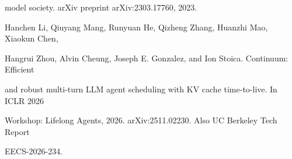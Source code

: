 \begin{flushleft}
\noindent  model society. arXiv preprint arXiv:2303.17760, 2023.\par
\noindent [16] Hanchen Li, Qiuyang Mang, Runyuan He, Qizheng Zhang, Huanzhi Mao, Xiaokun Chen,\par
\noindent  Hangrui Zhou, Alvin Cheung, Joseph E. Gonzalez, and Ion Stoica. Continuum: Efficient\par
\noindent  and robust multi-turn LLM agent scheduling with KV cache time-to-live. In ICLR 2026\par
\noindent  Workshop: Lifelong Agents, 2026. arXiv:2511.02230. Also UC Berkeley Tech Report\par
\noindent  EECS-2026-234.\par
\end{flushleft}
